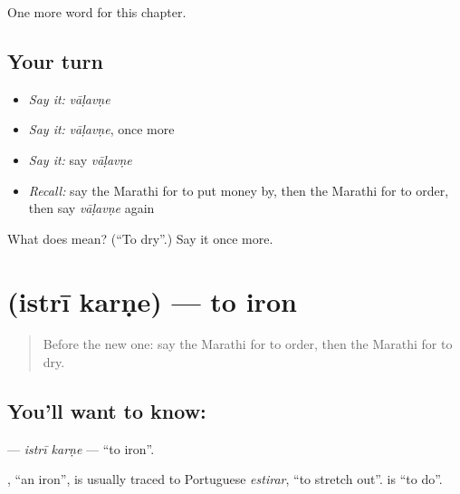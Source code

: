 \begin{grammarlens}[title={What you've built}]
One more word for this chapter.
\end{grammarlens}

\subsection*{Your turn}
\begin{itemize}
\raggedright
  \item \emph{Say it:} \emph{vāḷavṇe}
  \item \emph{Say it:} \emph{vāḷavṇe}, once more
  \item \emph{Say it:} say \emph{vāḷavṇe}
  \item \emph{Recall:} say the Marathi for to put money by, then the Marathi for to order, then say \emph{vāḷavṇe} again
\end{itemize}

\begin{tcolorbox}[breakable,colback=teal!4,colframe=teal!35!black,title={Before you move on}]
What does  mean? (\textquotedblleft{}To dry\textquotedblright{}.) Say it once more.
\end{tcolorbox}
\section[\texorpdfstring{\mr{इस्त्री} \mr{करणे} (istrī karṇe)}{इस्त्री करणे (istrī karṇe)}]{  (istrī karṇe) — to iron}

\label{lesson:MR-C193-istri-karne}



\begin{quote}
Before the new one: say the Marathi for to order, then the Marathi for to dry.
\end{quote}

\subsection*{You'll want to know:  }
\textbf{ } — \emph{istrī karṇe} — \textquotedblleft{}to iron\textquotedblright{}.

\begin{cousinweb}
\textbf{}, \textquotedblleft{}an iron\textquotedblright{}, is usually traced to Portuguese \emph{estirar}, \textquotedblleft{}to stretch out\textquotedblright{}. \textbf{} is \textquotedblleft{}to do\textquotedblright{}.
\end{cousinweb}

